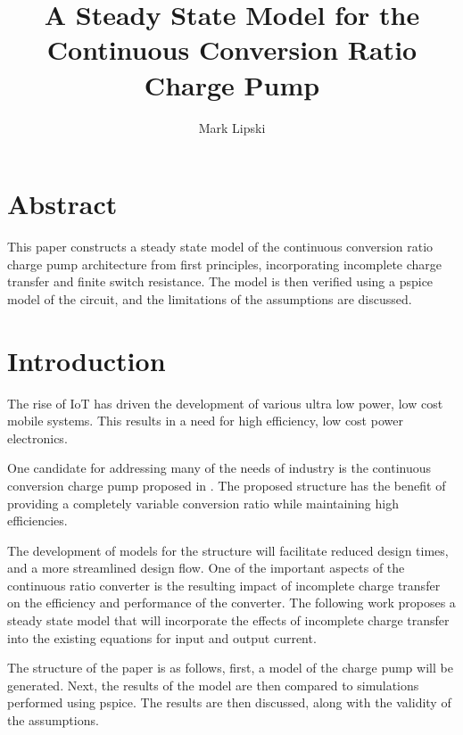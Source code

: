 \documentclass[conference]{IEEEtran}
\title{A Steady State Model for the Continuous Conversion Ratio Charge Pump}
\author{Mark Lipski}
\begin{document}
	\maketitle
	\section{Abstract}
	This paper constructs a steady state model of the continuous conversion ratio charge pump architecture from first principles, incorporating incomplete charge transfer and finite switch resistance. The model is then verified using a pspice model of the circuit, and the limitations of the assumptions are discussed.
	\section{Introduction}
	The rise of IoT has driven the development of various ultra low power, low cost mobile systems. This results in a need for high efficiency, low cost power electronics.
	
	One candidate for addressing many of the needs of industry is the continuous conversion charge pump proposed in \cite{Butzen2019	}. The proposed structure has the benefit of providing a completely variable conversion ratio while maintaining high efficiencies. 
	
	The development of models for the structure will facilitate reduced design times, and a more streamlined design flow. One of the important aspects of the continuous ratio converter is the resulting impact of incomplete charge transfer on the efficiency and performance of the converter. The following work proposes a steady state model that will incorporate the effects of incomplete charge transfer into the existing equations for input and output current.
	
	The structure of the paper is as follows, first, a model of the charge pump will be generated. Next, the results of the model are then compared to simulations performed using pspice. The results are then discussed, along with the validity of the assumptions.
\end{document}
